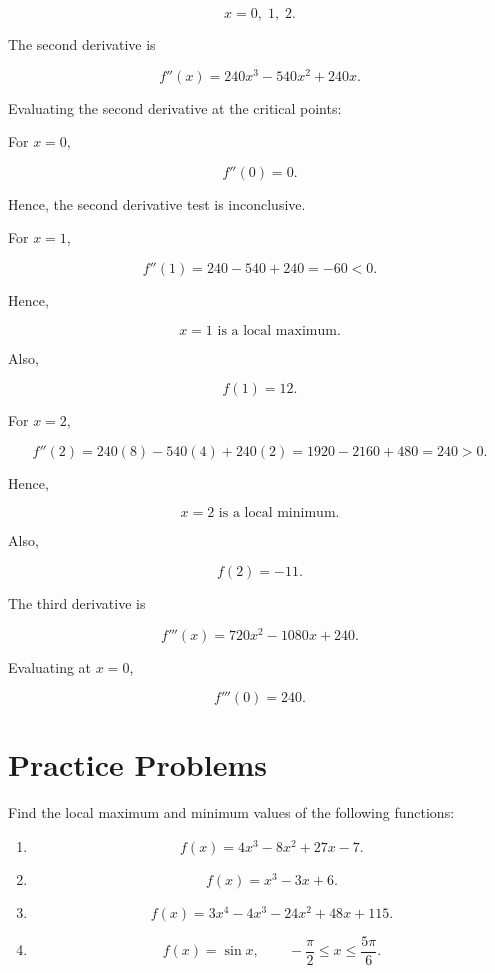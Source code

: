 \documentclass{article}
\begin{document}
\[
\boxed{x=0,\;1,\;2.}
\]

The second derivative is

\[
f''(x)=240x^3-540x^2+240x.
\]

Evaluating the second derivative at the critical points:

For \(x=0\),

\[
f''(0)=0.
\]

Hence, the second derivative test is inconclusive.

For \(x=1\),

\[
f''(1)=240-540+240
=-60<0.
\]

Hence,

\[
\boxed{x=1 \text{ is a local maximum}.}
\]

Also,

\[
f(1)=12.
\]

For \(x=2\),

\[
f''(2)=240(8)-540(4)+240(2)
=1920-2160+480
=240>0.
\]

Hence,

\[
\boxed{x=2 \text{ is a local minimum}.}
\]

Also,

\[
f(2)=-11.
\]

The third derivative is

\[
f'''(x)=720x^2-1080x+240.
\]

Evaluating at \(x=0\),

\[
f'''(0)=240.
\]

\hrulefill

\section*{Practice Problems}

Find the local maximum and minimum values of the following functions:

\begin{enumerate}
    \item
    \[
    f(x)=4x^3-8x^2+27x-7.
    \]

    \item
    \[
    f(x)=x^3-3x+6.
    \]

    \item
    \[
    f(x)=3x^4-4x^3-24x^2+48x+115.
    \]

    \item
    \[
    f(x)=\sin x,\qquad
    -\frac{\pi}{2}\le x\le\frac{5\pi}{6}.
    \]
\end{enumerate}

\hrulefill
\end{document}
